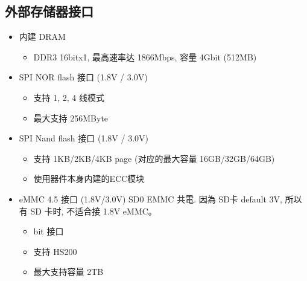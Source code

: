 \documentclass[letterpaper,10pt,english]{sphinxmanual}
\begin{document}
\subsection{外部存储器接口}
\label{\detokenize{contents/system-overview/features:id11}}\begin{itemize}
\item {} 
\sphinxAtStartPar
内建 DRAM
\begin{itemize}
\item {} 
\sphinxAtStartPar
DDR3 16bitx1, 最高速率达 1866Mbps, 容量 4Gbit (512MB)

\end{itemize}

\item {} 
\sphinxAtStartPar
SPI NOR flash 接口 (1.8V / 3.0V)
\begin{itemize}
\item {} 
\sphinxAtStartPar
支持 1, 2, 4 线模式

\item {} 
\sphinxAtStartPar
最大支持 256MByte

\end{itemize}

\item {} 
\sphinxAtStartPar
SPI Nand flash 接口 (1.8V / 3.0V)
\begin{itemize}
\item {} 
\sphinxAtStartPar
支持 1KB/2KB/4KB page (对应的最大容量 16GB/32GB/64GB)

\item {} 
\sphinxAtStartPar
使用器件本身内建的ECC模块

\end{itemize}

\item {} 
\sphinxAtStartPar
eMMC 4.5 接口 (1.8V/3.0V) SD0 EMMC 共電. 因為 SD卡 default 3V, 所以有
SD 卡时, 不适合接 1.8V eMMC。
\begin{itemize}
\item {} 
 bit 接口

\item {} 
\sphinxAtStartPar
支持 HS200

\item {} 
\sphinxAtStartPar
最大支持容量 2TB

\end{itemize}

\end{itemize}
\end{document}
